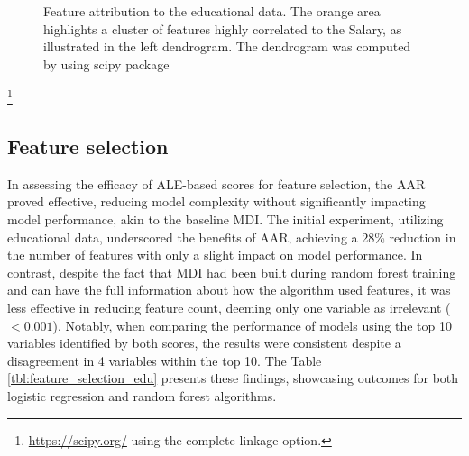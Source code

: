 \begin{figure}[ht!]
\centering
  \caption{Feature attribution to the educational data. The orange area highlights a cluster of features highly correlated to the Salary, as illustrated in the left dendrogram. The dendrogram was computed by using scipy package}
    \label{fig:edu_data}
\end{figure}

\footnote{\url{https://scipy.org/} using the complete linkage option.}

\subsection{Feature selection}

In assessing the efficacy of ALE-based scores for feature selection, the AAR proved effective, reducing model complexity without significantly impacting model performance, akin to the baseline MDI. The initial experiment, utilizing educational data, underscored the benefits of AAR, achieving a 28\% reduction in the number of features with only a slight impact on model performance. In contrast, despite the fact that MDI had been built during random forest training and can have the full information about how the algorithm used features, it was less effective in reducing feature count, deeming only one variable as irrelevant (\(< 0.001\)). Notably, when comparing the performance of models using the top 10 variables identified by both scores, the results were consistent despite a disagreement in 4 variables within the top 10. The Table \ref{tbl:feature_selection_edu} presents these findings, showcasing outcomes for both logistic regression and random forest algorithms.

